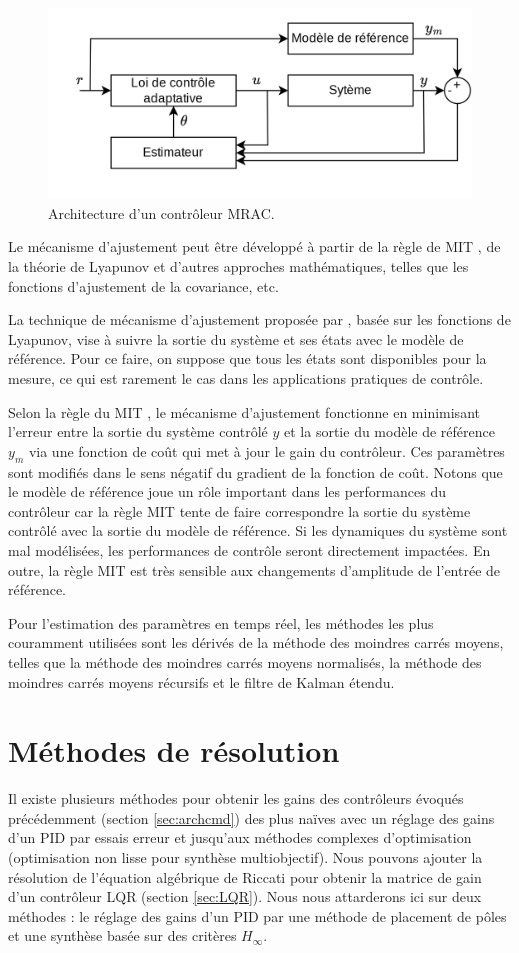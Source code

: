 \begin{figure}[ht!]
    \centerline{
    \includegraphics[trim=0cm 0cm 0cm 0cm,clip,width=0.5\columnwidth]{figures/Mrac.png}}
    \caption{Architecture d'un contrôleur MRAC.}
    \label{fig:schemaMRAC}
\end{figure}


Le mécanisme d'ajustement peut être développé à partir de la règle de MIT \cite{Jain2013DesignOA}, de la théorie de Lyapunov \cite{GE1999741, CHAKRABARTY2016213} et d'autres approches mathématiques, telles que les fonctions d'ajustement de la covariance, etc. 

La technique de mécanisme d'ajustement proposée par \cite{CHAKRABARTY2016213}, basée sur les fonctions de Lyapunov, vise à suivre la sortie du système et ses états avec le modèle de référence. Pour ce faire, on suppose que tous les états sont disponibles pour la mesure, ce qui est rarement le cas dans les applications pratiques de contrôle.

Selon la règle du MIT \cite{Shekhar2018}, le mécanisme d'ajustement fonctionne en minimisant l'erreur entre la sortie du système contrôlé $y$ et la sortie du modèle de référence $y_{m}$ via une fonction de coût qui met à jour le gain du contrôleur. Ces paramètres sont modifiés dans le sens négatif du gradient de la fonction de coût. Notons que le modèle de référence joue un rôle important dans les performances du contrôleur car la règle MIT tente de faire correspondre la sortie du système contrôlé avec la sortie du modèle de référence. Si les dynamiques du système sont mal modélisées, les performances de contrôle seront directement impactées.
En outre, la règle MIT est très sensible aux changements d'amplitude de l'entrée de référence.

Pour l'estimation des paramètres en temps réel, les méthodes les plus couramment utilisées sont les dérivés de la méthode des moindres carrés moyens, telles que la méthode des moindres carrés moyens normalisés, la méthode des moindres carrés moyens récursifs et le filtre de Kalman étendu. 

\section{Méthodes de résolution}
\label{sec:methodo}
    Il existe plusieurs méthodes pour obtenir les gains des contrôleurs évoqués précédemment (section \ref{sec:archcmd}) des plus naïves avec un réglage des gains d'un PID par essais erreur et jusqu'aux méthodes complexes d'optimisation (optimisation non lisse pour synthèse multiobjectif). Nous pouvons ajouter la résolution de l'équation algébrique de Riccati pour obtenir la matrice de gain d'un contrôleur LQR (section \ref{sec:LQR}). Nous nous attarderons ici sur deux méthodes : le réglage des gains d'un PID par une méthode de placement de pôles et une synthèse basée sur des critères $H_{\infty}$.


